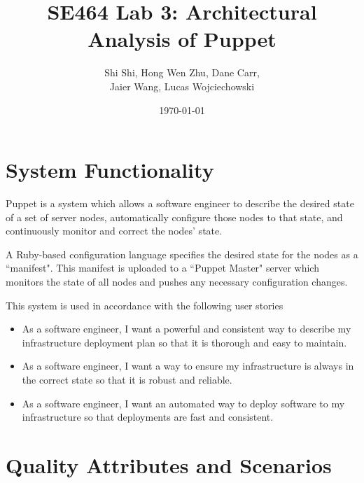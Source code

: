 \documentclass[a4paper]{article}
\title{SE464 Lab 3: Architectural Analysis of Puppet}
\author{Shi Shi, Hong Wen Zhu, Dane Carr, \\ Jaier Wang, Lucas Wojciechowski}
\date{\today}
\begin{document}
\maketitle

\section{System  Functionality} %


Puppet is a system which allows a software engineer to describe the desired state of a set of server nodes, automatically configure those nodes to that state, and continuously monitor and correct the nodes' state.

A Ruby-based configuration language specifies the desired state for the nodes as a ``manifest". This manifest is uploaded to a ``Puppet Master" server which monitors the state of all nodes and pushes any necessary configuration changes.

This system is used in accordance with the following user stories
\begin{itemize}
\item As a software engineer, I want a powerful and consistent way to describe my infrastructure deployment plan so that it is thorough and easy to maintain.
\item As a software engineer, I want a way to ensure my infrastructure is always in the correct state so that it is robust and reliable.
\item As a software engineer, I want an automated way to deploy software to my infrastructure so that deployments are fast and consistent.
\end{itemize}

\section{Quality Attributes and Scenarios} %


\end{document}
